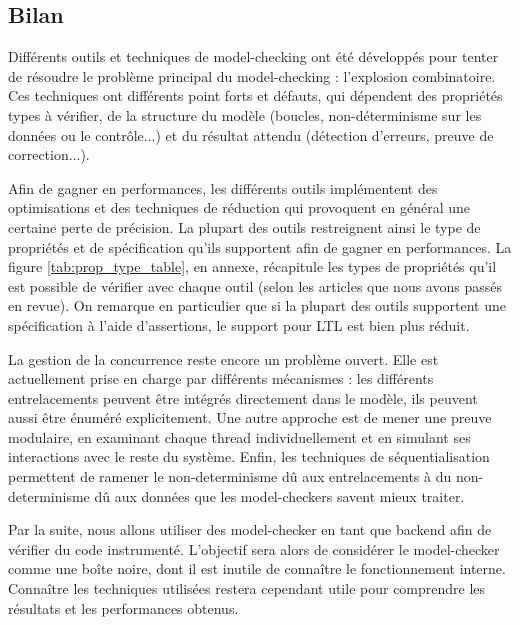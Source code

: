 \subsection{Bilan}

Différents outils et techniques de model-checking ont été développés pour
tenter de résoudre le problème principal du model-checking : l'explosion
combinatoire. Ces techniques ont différents point forts et défauts, qui
dépendent des propriétés types à vérifier, de la structure du modèle (boucles,
non-déterminisme sur les données ou  le contrôle...) et du résultat attendu
(détection d'erreurs, preuve de correction...).

Afin de gagner en performances, les différents outils implémentent des
optimisations et des techniques de réduction qui provoquent en général une
certaine perte de précision. La plupart des outils restreignent ainsi le type de
propriétés et de spécification qu'ils supportent afin de gagner en performances.
La figure \ref{tab:prop_type_table}, en annexe, récapitule les types de
propriétés qu'il est possible de vérifier avec chaque outil (selon les articles
que nous avons passés en revue). On remarque en particulier que si la plupart
des outils supportent une spécification à l'aide d'assertions, le support pour
LTL est bien plus réduit.

La gestion de la concurrence reste encore un problème ouvert.
Elle est actuellement prise en charge par différents mécanismes : les
différents entrelacements peuvent être intégrés directement dans le modèle, ils
peuvent aussi être énuméré explicitement. Une autre approche est de mener une
preuve modulaire, en examinant chaque thread individuellement et en simulant ses
interactions avec le reste du système. Enfin, les techniques de
séquentialisation permettent de ramener le non-determinisme dû aux
entrelacements à du non-determinisme dû aux données que les model-checkers
savent mieux traiter.

Par la suite, nous allons utiliser des model-checker en tant que backend
afin de vérifier du code instrumenté. L'objectif sera alors de considérer le
model-checker comme une boîte noire, dont il est inutile de connaître le
fonctionnement interne. Connaître les techniques utilisées restera cependant
utile pour comprendre les résultats et les performances obtenus.